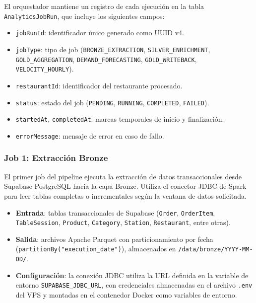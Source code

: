 El orquestador mantiene un registro de cada ejecución en la tabla
\texttt{AnalyticsJobRun}, que incluye los siguientes campos:

\begin{itemize}[leftmargin=1.5em]
  \item \texttt{jobRunId}: identificador único generado como UUID v4.
  \item \texttt{jobType}: tipo de job (\texttt{BRONZE\_EXTRACTION},
  \texttt{SILVER\_ENRICHMENT}, \texttt{GOLD\_AGGREGATION},
  \texttt{DEMAND\_FORECASTING}, \texttt{GOLD\_WRITEBACK},
  \texttt{VELOCITY\_HOURLY}).
  \item \texttt{restaurantId}: identificador del restaurante procesado.
  \item \texttt{status}: estado del job (\texttt{PENDING},
  \texttt{RUNNING}, \texttt{COMPLETED}, \texttt{FAILED}).
  \item \texttt{startedAt}, \texttt{completedAt}: marcas temporales de
  inicio y finalización.
  \item \texttt{errorMessage}: mensaje de error en caso de fallo.
\end{itemize}

\subsubsection{Job 1: Extracción Bronze}

El primer job del pipeline ejecuta la extracción de datos transaccionales
desde Supabase PostgreSQL hacia la capa Bronze. Utiliza el conector JDBC
de Spark para leer tablas completas o incrementales según la ventana de
datos solicitada.

\begin{itemize}[leftmargin=1.5em]
  \item \textbf{Entrada}: tablas transaccionales de Supabase
  (\texttt{Order}, \texttt{OrderItem}, \texttt{TableSession},
  \texttt{Product}, \texttt{Category}, \texttt{Station},
  \texttt{Restaurant}, entre otras).
  \item \textbf{Salida}: archivos Apache Parquet con particionamiento
  por fecha (\texttt{partitionBy("execution\_date")}), almacenados en
  \texttt{/data/bronze/YYYY-MM-DD/}.
  \item \textbf{Configuración}: la conexión JDBC utiliza la URL
  definida en la variable de entorno \texttt{SUPABASE\_JDBC\_URL},
  con credenciales almacenadas en el archivo \texttt{.env} del VPS y
  montadas en el contenedor Docker como variables de entorno.
\end{itemize}

